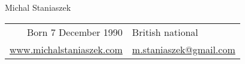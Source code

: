 \documentclass[a4paper,10pt]{article}
\begin{document}
\thispagestyle{empty}
\pagestyle{empty}
\begin{center}\Huge Michal Staniaszek\\
  \normalsize \vskip 0.3cm
  \begin{tabular}{rl}
  Born 7 December 1990 & British national\\
\url{www.michalstaniaszek.com} & \href{mailto:contact@michalstaniaszek.com}{m.staniaszek@gmail.com}
  \end{tabular}
\end{center}

\end{document}
